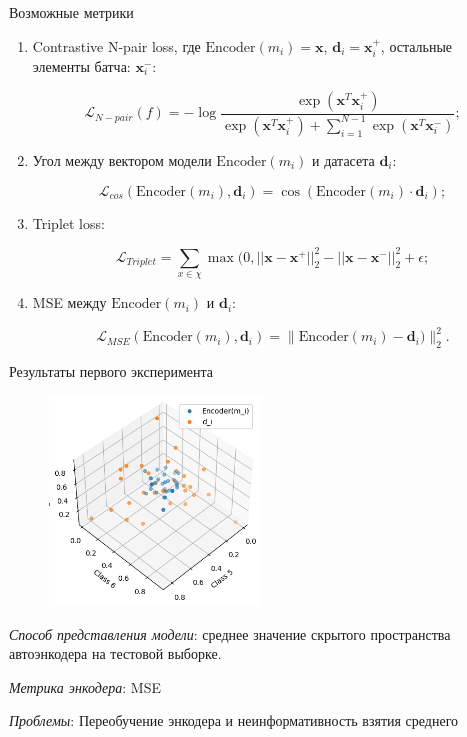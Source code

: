 \documentclass{beamer}
\begin{document}
\begin{frame}{Возможные метрики}
\small
\begin{enumerate}
    \item Contrastive N-pair loss, где $\text{Encoder}(m_i) = \textbf{x}$, $\textbf{d}_i = \textbf{x}_i^+$, остальные элементы батча: $\textbf{x}_i^-$:

\[\mathcal{L}_{N-pair}(f) = - \log \frac{\exp(\textbf{x}^T \textbf{x}_i^+)}{\exp(\textbf{x}^T \textbf{x}_i^+) + \sum _{i=1}^{N-1} \exp(\textbf{x}^T\textbf{x}_i^-)};\]
    \item Угол между вектором модели $\text{Encoder}(m_i)$ и датасета $\textbf{d}_i$:

\[\mathcal{L}_{cos}(\text{Encoder}(m_i), \textbf{d}_i) = \cos(\text{Encoder}(m_i) \cdot \textbf{d}_i);\]

    \item Triplet loss:

\[\mathcal{L}_{Triplet} = \sum\limits_{x \in \chi}\max(0, ||\textbf{x} - \textbf{x}^+||_2^2 - ||\textbf{x} - \textbf{x}^-||_2^2 + \epsilon;\]

    \item MSE между $\text{Encoder}(m_i)$ и $\textbf{d}_i$:

\[\mathcal{L}_{MSE}(\text{Encoder}(m_i), \textbf{d}_i) = \|\text{Encoder}(m_i) - \textbf{d}_i)\|_2^2.\]
\end{enumerate}
\end{frame}
\begin{frame}{Результаты первого эксперимента}
\begin{figure}
  \vspace{-30pt}
  \begin{center}
    \includegraphics[width=0.5\textwidth]{Pictures/Encoder.png}
  \end{center}
  \vspace{-20pt}
\end{figure}

\textit{Способ представления модели}: среднее значение скрытого пространства автоэнкодера на тестовой выборке.

\bigskip

\textit{Метрика энкодера}: MSE

\bigskip

\textit{Проблемы}: Переобучение энкодера и неинформативность взятия среднего
\end{frame}
\end{document}
